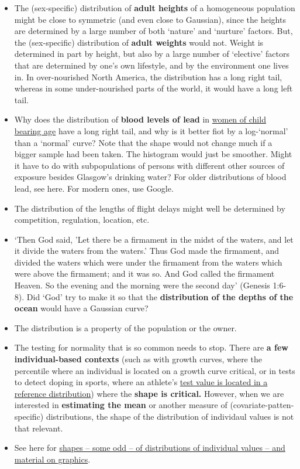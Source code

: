\documentclass[]{book}
\begin{document}
\begin{itemize}
\item
  The (sex-specific) distribution of \textbf{adult heights} of a homogeneous population might be close to symmetric (and even close to Gaussian), since the heights are determined by a large number of both `nature' and `nurture' factors. But, the (sex-specific) distribution of \textbf{adult weights} would not. Weight is determined in part by height, but also by a large number of `elective' factors that are determined by one's own lifestyle, and by the environment one lives in. In over-nourished North America, the distribution has a long right tail, whereas in some under-nourished parts of the world, it would have a long left tail.
\item
  Why does the distribution of \textbf{blood levels of lead} in
  \href{http://www.medicine.mcgill.ca/epidemiology/hanley/c607/ch01/homegrown_exercises_01.pdf\#page=2}{women of child bearing age} have a long right tail, and why is it better fiot by a log-`normal' than a `normal' curve? Note that the shape would not change much if a bigger sample had been taken. The histogram would just be smoother. Might it have to do with subpopulations of persons with different other sources of exposure besides Glasgow's drinking water? For older distributions of blood lead, see here. For modern ones, use Google.
\item
  The distribution of the lengths of flight delays might well be determined by competition, regulation, location, etc.
\item
  `Then God said, 'Let there be a firmament in the midst of the waters, and let it divide the waters from the waters.' Thus God made the firmament, and divided the waters which were under the firmament from the waters which were above the firmament; and it was so. And God called the firmament Heaven. So the evening and the morning were the second day' (Genesis 1:6-8). Did `God' try to make it so that the \textbf{distribution of the depths of the ocean} would have a Gaussian curve?
\item
  The distribution is a property of the population or the owner.
\item
  The testing for normality that is so common needs to stop. There are \textbf{a few individual-based contexts} (such as with growth curves, where the percentile where an individual is located on a growth curve critical, or in tests to detect doping in sports, where an athlete's \href{http://www.medicine.mcgill.ca/epidemiology/hanley/Reprints/TestingForHumanIGFdoping.pdf}{test value is located in a reference distribution}) where the \textbf{shape is critical.} However, when we are interested in \textbf{estimating the mean} or another measure of (covariate-patten-specific) distributions, the shape of the distribution of individaul values is not that relevant.
\item
  See here for \href{http://www.medicine.mcgill.ca/epidemiology/hanley/bios601/DescriptiveStatistics/}{shapes -- some odd -- of distributions of individual values -- and material on graphics}.
\end{itemize}
\end{document}
